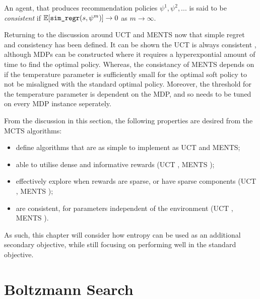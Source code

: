     An agent, that produces recommendation policies $\psi^1,\psi^2,...$ is said to be \textit{consistent} if $\mathbb{E}[{\textnormal{\texttt{sim\_regr}}}(s,\psi^m)] \rightarrow 0$ as $m\rightarrow \infty$.

    Returning to the discussion around UCT and MENTS now that simple regret and consistency has been defined. It can be shown the UCT is always consistent , although MDPs can be constructed where it requires a hyperexpontial amount of time to find the optimal policy. Whereas, the consistancy of MENTS depends on if the temperature parameter is sufficiently small for the optimal soft policy to not be misaligned with the standard optimal policy. Moreover, the threshold for the temperature parameter is dependent on the MDP, and so needs to be tuned on every MDP instance seperately.
    




    From the discussion in this section, the following properties are desired from the MCTS algorithms:
    \begin{itemize}
        \item define algorithms that are as simple to implement as UCT and MENTS;
        \item able to utilise dense and informative rewards (UCT \tick, MENTS \tick);
        \item effectively explore when rewards are sparse, or have sparse components (UCT \cross, MENTS \tick);
        \item are consistent, for parameters independent of the environment (UCT \tick, MENTS \cross). 
    \end{itemize}

    As such, this chapter will consider how entropy can be used as an additional secondary objective, while still focusing on performing well in the standard objective. 









\section{Boltzmann Search}
\label{sec:4-2-boltzmannsearch}

